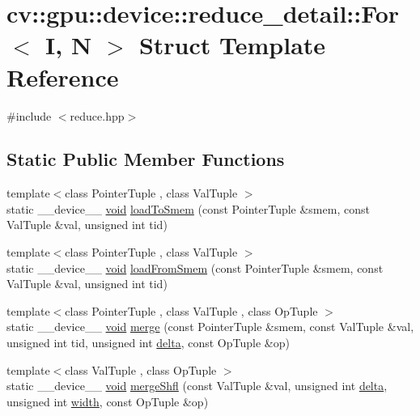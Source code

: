 \hypertarget{structcv_1_1gpu_1_1device_1_1reduce__detail_1_1For}{\section{cv\-:\-:gpu\-:\-:device\-:\-:reduce\-\_\-detail\-:\-:For$<$ I, N $>$ Struct Template Reference}
\label{structcv_1_1gpu_1_1device_1_1reduce__detail_1_1For}
}


{\ttfamily \#include $<$reduce.\-hpp$>$}

\subsection*{Static Public Member Functions}
\begin{DoxyCompactItemize}
\item 
{\footnotesize template$<$class Pointer\-Tuple , class Val\-Tuple $>$ }\\static \-\_\-\-\_\-device\-\_\-\-\_\- \hyperlink{legacy_8hpp_a8bb47f092d473522721002c86c13b94e}{void} \hyperlink{structcv_1_1gpu_1_1device_1_1reduce__detail_1_1For_a5f90777d6d42f628ce11758cc3bc2cb6}{load\-To\-Smem} (const Pointer\-Tuple \&smem, const Val\-Tuple \&val, unsigned int tid)
\item 
{\footnotesize template$<$class Pointer\-Tuple , class Val\-Tuple $>$ }\\static \-\_\-\-\_\-device\-\_\-\-\_\- \hyperlink{legacy_8hpp_a8bb47f092d473522721002c86c13b94e}{void} \hyperlink{structcv_1_1gpu_1_1device_1_1reduce__detail_1_1For_ab9eafaac3b4f3584b57da7001d012b7c}{load\-From\-Smem} (const Pointer\-Tuple \&smem, const Val\-Tuple \&val, unsigned int tid)
\item 
{\footnotesize template$<$class Pointer\-Tuple , class Val\-Tuple , class Op\-Tuple $>$ }\\static \-\_\-\-\_\-device\-\_\-\-\_\- \hyperlink{legacy_8hpp_a8bb47f092d473522721002c86c13b94e}{void} \hyperlink{structcv_1_1gpu_1_1device_1_1reduce__detail_1_1For_a5ae09462725bc8aa5016b11fb3021911}{merge} (const Pointer\-Tuple \&smem, const Val\-Tuple \&val, unsigned int tid, unsigned int \hyperlink{legacy_8hpp_ac867054f00f4be8b1f3ebce6fba31982}{delta}, const Op\-Tuple \&op)
\item 
{\footnotesize template$<$class Val\-Tuple , class Op\-Tuple $>$ }\\static \-\_\-\-\_\-device\-\_\-\-\_\- \hyperlink{legacy_8hpp_a8bb47f092d473522721002c86c13b94e}{void} \hyperlink{structcv_1_1gpu_1_1device_1_1reduce__detail_1_1For_aa4a8db1757215f7e95f081c6ec0dfc74}{merge\-Shfl} (const Val\-Tuple \&val, unsigned int \hyperlink{legacy_8hpp_ac867054f00f4be8b1f3ebce6fba31982}{delta}, unsigned int \hyperlink{highgui__c_8h_a2474a5474cbff19523a51eb1de01cda4}{width}, const Op\-Tuple \&op)
\end{DoxyCompactItemize}


